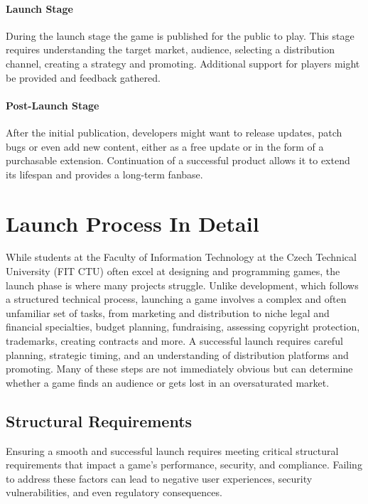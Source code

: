 \paragraph{Launch Stage}
During the launch stage the game is published for the public to play. This stage requires understanding the target market, audience, selecting a distribution channel, creating a strategy and promoting. Additional support for players might be provided and feedback gathered.

\paragraph{Post-Launch Stage}
After the initial publication, developers might want to release updates, patch bugs or even add new content, either as a free update or in the form of a purchasable extension. Continuation of a successful product allows it to extend its lifespan and provides a long-term fanbase.

\section{Launch Process In Detail}
While students at the Faculty of Information Technology at the Czech Technical University (FIT CTU) often excel at designing and programming games, the launch phase is where many projects struggle. Unlike development, which follows a structured technical process, launching a game involves a complex and often unfamiliar set of tasks, from marketing and distribution to niche legal and financial specialties, budget planning, fundraising, assessing copyright protection, trademarks, creating contracts and more. A successful launch requires careful planning, strategic timing, and an understanding of distribution platforms and promoting. Many of these steps are not immediately obvious but can determine whether a game finds an audience or gets lost in an oversaturated market.

\subsection{Structural Requirements}
Ensuring a smooth and successful launch requires meeting critical structural requirements that impact a game’s performance, security, and compliance. Failing to address these factors can lead to negative user experiences, security vulnerabilities, and even regulatory consequences.

